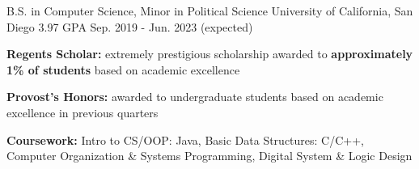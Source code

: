 

\begin{cventries}

    \cventry
    {B.S. in Computer Science, Minor in Political Science} %
    {University of California, San Diego} %
    {3.97 GPA} %
    {Sep. 2019 - Jun. 2023 (expected)} %
    {
      \begin{cvitems} %
        \item {\textbf{Regents Scholar:} extremely prestigious scholarship awarded to \textbf{approximately 1\% of students} based on academic excellence}
        \item {\textbf{Provost's Honors:} awarded to undergraduate students based on academic excellence in previous quarters}
        \item {\textbf{Coursework:} Intro to CS/OOP: Java, Basic Data Structures: C/C++, Computer Organization \& Systems Programming, Digital System \& Logic Design}
      \end{cvitems}
    }

\end{cventries}
